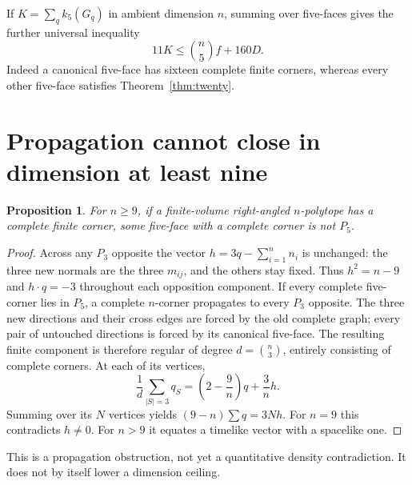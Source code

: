 \documentclass[11pt]{article}
\newtheorem{proposition}[theorem]{Proposition}
\begin{document}
If $K=\sum_q k_5(G_q)$ in ambient dimension $n$, summing over five-faces
gives the further universal inequality
\begin{equation}\label{eq:k5}
 11K\le\binom n5 f+160D.
\end{equation}
Indeed a canonical five-face has sixteen complete finite corners,
whereas every other five-face satisfies Theorem~\ref{thm:twenty}.

\section{Propagation cannot close in dimension at least nine}
\begin{proposition}
For $n\ge9$, if a finite-volume right-angled $n$-polytope has a complete
finite corner, some five-face with a complete corner is not $P_5$.
\end{proposition}
\begin{proof}
Across any $P_3$ opposite the vector
$h=3q-\sum_{i=1}^n n_i$ is unchanged: the three new normals are the
three $m_{ij}$, and the others stay fixed. Thus $h^2=n-9$ and
$h\cdot q=-3$ throughout each opposition component.
If every complete five-corner lies in $P_5$, a complete $n$-corner
propagates to every $P_3$ opposite. The three new directions and their
cross edges are forced by the old complete graph; every pair of
untouched directions is forced by its canonical five-face.
The resulting finite component is therefore regular of degree
$d=\binom n3$, entirely consisting of complete corners.
At each of its vertices,
\[
 \frac1d\sum_{|S|=3}q_S
 =\left(2-\frac9n\right)q+\frac3n h.
\]
Summing over its $N$ vertices yields
$(9-n)\sum q=3Nh$. For $n=9$ this contradicts $h\ne0$.
For $n>9$ it equates a timelike vector with a spacelike one.
\end{proof}
This is a propagation obstruction, not yet a quantitative density
contradiction. It does not by itself lower a dimension ceiling.
\end{document}
